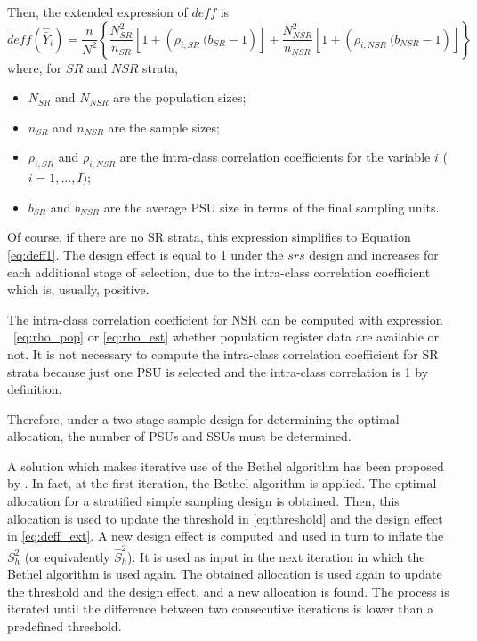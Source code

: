 Then, the extended expression of $deff$ \citep[see, among others,][]{rojas2016estrategias} is
\begin{equation} 
	\label{eq:deff_ext}
	deff \left(\hat{\bar{Y}}_{i}\right) 
	=  \frac{n}{N^2} \left\lbrace
 \frac{N_{SR}^2}{n_{SR}} \left[ 1 + \left( \rho_{i,SR} \  (b_{SR} - 1 \right) \right] +
	\frac{N_{NSR}^2}{n_{NSR}} \left[ 1 + \left(\rho_{i,NSR} \ (b_{NSR} - 1 \right) \right] \right\rbrace
\end{equation}
where, for $SR$ and $NSR$ strata, 
\begin{itemize}
	\item $N_{SR}$ and $N_{NSR}$ are the population sizes;
	\item $n_{SR}$ and $n_{NSR}$ are the sample sizes;
	\item $\rho_{i,SR}$ and $\rho_{i,NSR}$ are the intra-class correlation coefficients for the variable $i$ ($i=1, \dots, I)$;
	\item $b_{SR}$ and $b_{NSR}$ are the average PSU size in terms of the final sampling units.
\end{itemize} 
Of course, if there are no SR strata, this expression simplifies to Equation \eqref{eq:deff1}. 
The design effect is equal to 1 under the $srs$ design and increases for each additional stage of selection, due to the intra-class correlation coefficient which is, usually, positive.

The intra-class correlation coefficient for NSR can be computed with expression ~\eqref{eq:rho_pop} or \eqref{eq:rho_est} whether population register data are available or not.
It is not necessary to compute the intra-class correlation coefficient for SR strata because just one PSU is selected and the intra-class correlation is 1 by definition.

Therefore, under a two-stage sample design for determining the optimal allocation, the number of PSUs and SSUs must be determined.

A solution which makes iterative use of the Bethel algorithm has been proposed by \cite{falorsi1998principi}.
In fact, at the first iteration, the Bethel algorithm is applied. 
The optimal allocation for a stratified simple sampling design is obtained. 
Then, this allocation is used to update the threshold in \eqref{eq:threshold} and the design effect in \eqref{eq:deff_ext}.
A new design effect is computed and used in turn to inflate the $S_h^2$ (or equivalently $\hat{S}_h^2$).
It is used as input in the next iteration in which the Bethel algorithm is used again.
The obtained allocation is used again to update the threshold and the design effect, and a new allocation is found.
The process is iterated until the difference between two consecutive iterations is lower than a predefined threshold.

